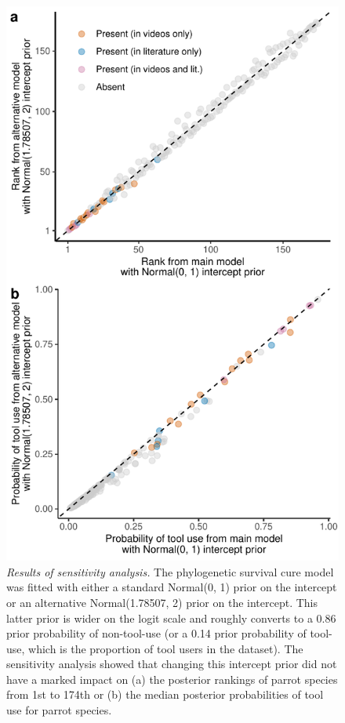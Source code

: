 \documentclass[
  man,floatsintext]{apa6}
\begin{document}
\begin{figure}
\centering
\includegraphics{manuscript_files/figure-latex/plotSurvCure8-1.pdf}
\caption{\label{fig:plotSurvCure8}\emph{Results of sensitivity analysis.} The phylogenetic survival cure model was fitted with either a standard Normal(0, 1) prior on the intercept or an alternative Normal(1.78507, 2) prior on the intercept. This latter prior is wider on the logit scale and roughly converts to a 0.86 prior probability of non-tool-use (or a 0.14 prior probability of tool-use, which is the proportion of tool users in the dataset). The sensitivity analysis showed that changing this intercept prior did not have a marked impact on (a) the posterior rankings of parrot species from 1st to 174th or (b) the median posterior probabilities of tool use for parrot species.}
\end{figure}
\end{document}
